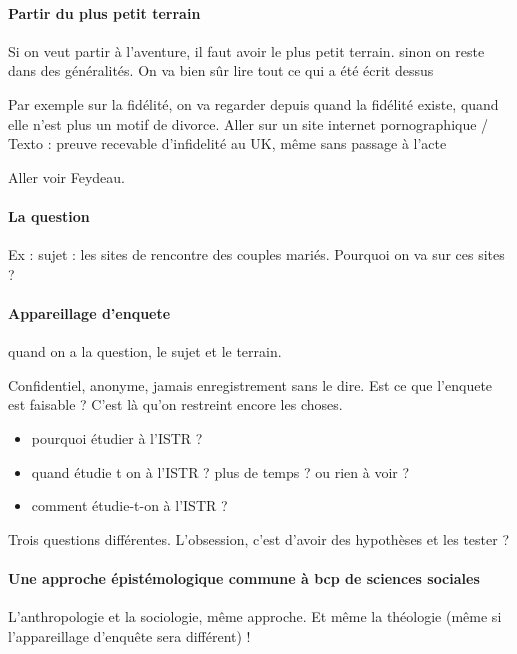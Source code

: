\paragraph{Partir du plus petit terrain} Si on veut partir à l'aventure, il faut avoir le plus petit terrain. sinon on reste dans des généralités. On va bien sûr lire tout ce qui a été écrit dessus 
\begin{Ex}
Par exemple sur la fidélité, on va regarder depuis quand la fidélité existe, quand elle n'est plus un motif de divorce.
Aller sur un site internet pornographique / Texto : preuve recevable d'infidelité au UK, même sans passage à l'acte

Aller voir Feydeau.  
\end{Ex}

\paragraph{La question}
\begin{Ex}
Ex : sujet : les sites de rencontre des couples mariés.
Pourquoi on va sur ces sites ?

\end{Ex}

\paragraph{Appareillage d'enquete} quand on a la question, le sujet et le terrain.

Confidentiel, anonyme, jamais enregistrement sans le dire. Est ce que l'enquete est faisable ? C'est là qu'on restreint encore les choses. 

\begin{itemize}
\item pourquoi étudier à l'ISTR ? 
\item quand étudie t on à l'ISTR ? plus de temps ? ou rien à voir ?
\item comment étudie-t-on à l'ISTR ?
\end{itemize}
Trois questions différentes. L'obsession, c'est d'avoir des hypothèses et les tester ? 


\paragraph{Une approche épistémologique commune à bcp de sciences sociales } L'anthropologie et la sociologie, même approche. Et même la théologie (même si l'appareillage d'enquête sera différent) !

